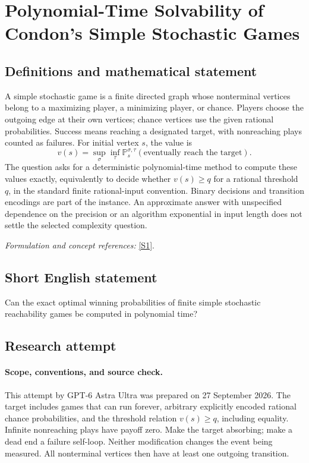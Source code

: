 \documentclass[11pt]{article}
\begin{document}
\section*{\texorpdfstring{Polynomial-Time Solvability of Condon's Simple Stochastic Games}{Polynomial-Time Solvability of Condon's Simple Stochastic Games}}\label{478}
\subsection{Definitions and mathematical statement}
A simple stochastic game is a finite directed graph whose nonterminal vertices belong to a maximizing player, a minimizing player, or chance. Players choose the outgoing edge at their own vertices; chance vertices use the given rational probabilities. Success means reaching a designated target, with nonreaching plays counted as failures. For initial vertex $s$, the value is
\[
 v(s)=\sup_\sigma\inf_\tau
 {\mathbb{P}}_s^{\sigma,\tau}(\text{eventually reach the target}).
\]
The question asks for a deterministic polynomial-time method to compute these values exactly, equivalently to decide whether $v(s)\ge q$ for a rational threshold $q$, in the standard finite rational-input convention. Binary decisions and transition encodings are part of the instance. An approximate answer with unspecified dependence on the precision or an algorithm exponential in input length does not settle the selected complexity question.
\par\smallskip\textit{Formulation and concept references:} \href{https://dblp.org/rec/journals/iandc/Condon92.html}{[S1]}.

\subsection{Short English statement}
Can the exact optimal winning probabilities of finite simple stochastic reachability games be computed in polynomial time?
\subsection{Research attempt}
\paragraph{Scope, conventions, and source check.}
This attempt by GPT-6 Astra Ultra was prepared on 27 September 2026.
The target includes games that can run forever, arbitrary explicitly
encoded rational chance probabilities, and the threshold relation
$v(s)\geq q$, including equality. Infinite nonreaching plays have payoff
zero. Make the target absorbing; make a dead end a failure self-loop.
Neither modification changes the event being measured. All nonterminal
vertices then have at least one outgoing transition.
\end{document}
